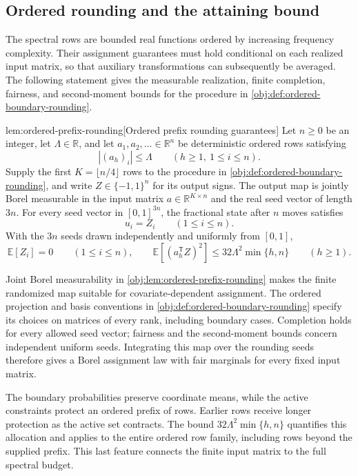 \subsection{Ordered rounding and the attaining bound}

The spectral rows are bounded real functions ordered by increasing frequency complexity. Their assignment guarantees must hold conditional on each realized input matrix, so that auxiliary transformations can subsequently be averaged. The following statement gives the measurable realization, finite completion, fairness, and second-moment bounds for the procedure in \cref{obj:def:ordered-boundary-rounding}.

\begin{lemmav}{lem:ordered-prefix-rounding}[Ordered prefix rounding guarantees]
Let \(n\geq0\) be an integer, let \(\Lambda\in\mathbb R\), and let \(a_1,a_2,\ldots\in\mathbb R^n\) be deterministic ordered rows satisfying
\[
|(a_h)_i|\leq\Lambda
\qquad(h\geq1,\ 1\leq i\leq n).
\]
Supply the first \(K=\lfloor n/4\rfloor\) rows to the procedure in \cref{obj:def:ordered-boundary-rounding}, and write \(Z\in\{-1,1\}^n\) for its output signs. The output map is jointly Borel measurable in the input matrix \(a\in\mathbb R^{K\times n}\) and the real seed vector of length \(3n\). For every seed vector in \([0,1]^{3n}\), the fractional state after \(n\) moves satisfies
\[
u_i=Z_i\qquad(1\leq i\leq n).
\]
With the \(3n\) seeds drawn independently and uniformly from \([0,1]\),
\[
\mathbb E[Z_i]=0
\qquad(1\leq i\leq n),
\qquad
\mathbb E\!\left[(a_h^{\mathsf T}Z)^2\right]
\leq32\Lambda^2\min\{h,n\}
\qquad(h\geq1).
\]
\end{lemmav}

Joint Borel measurability in \cref{obj:lem:ordered-prefix-rounding} makes the finite randomized map suitable for covariate-dependent assignment. The ordered projection and basis conventions in \cref{obj:def:ordered-boundary-rounding} specify its choices on matrices of every rank, including boundary cases. Completion holds for every allowed seed vector; fairness and the second-moment bounds concern independent uniform seeds. Integrating this map over the rounding seeds therefore gives a Borel assignment law with fair marginals for every fixed input matrix.

The boundary probabilities preserve coordinate means, while the active constraints protect an ordered prefix of rows. Earlier rows receive longer protection as the active set contracts. The bound \(32\Lambda^2\min\{h,n\}\) quantifies this allocation and applies to the entire ordered row family, including rows beyond the supplied prefix. This last feature connects the finite input matrix to the full spectral budget.

